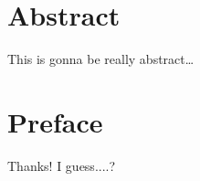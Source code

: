 
\chapter*{Abstract}
\label{sec:Abstract}
This is gonna be really abstract\dots

\chapter*{Preface}
\label{sec:Vorwort}
Thanks! I guess....?